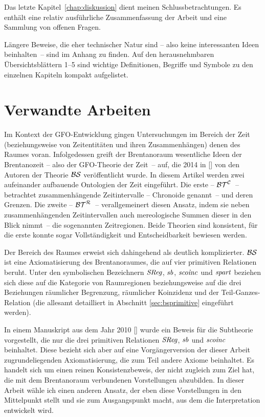 Das
letzte Kapitel~\ref{chap:diskussion} dient meinen Schlussbetrachtungen.
Es enthält eine relativ ausführliche Zusammenfassung der Arbeit und eine Sammlung von offenen Fragen.

Längere
Beweise, die eher technischer Natur sind -- also keine interessanten Ideen beinhalten~-- sind im Anhang zu finden.
Auf den herausnehmbaren Übersichtsblättern 1--5 sind wichtige Definitionen, Begriffe und Symbole zu den einzelnen Kapiteln kompakt aufgelistet.


\section{Verwandte Arbeiten}
Im Kontext der GFO-Entwicklung gingen Untersuchungen im Bereich der Zeit (beziehungsweise
von Zeitentitäten und ihren Zusammenhängen) denen des Raumes voran.
    Infolgedessen greift der Brentanoraum
    wesentliche Ideen der Brentanozeit -- also der GFO-Theorie der Zeit~-- auf, die 2014 in [\cite{baumann-r-2014-171-a}] von den Autoren der Theorie $\mathcal{BS}$ veröffentlicht wurde.
    In diesem Artikel werden zwei aufeinander aufbauende Ontologien der Zeit eingeführt.
    Die erste -- $\mathcal{BT}^{\mathcal{C}}$~-- betrachtet zusammenhängende Zeitintervalle -- Chronoide genannt~-- und deren Grenzen. 
    Die zweite -- $\mathcal{BT}^{\mathcal{R}}$~-- verallgemeinert diesen Ansatz, indem sie neben zusammenhängenden Zeitintervallen auch mereologische Summen dieser in den Blick nimmt~-- die sogenannten Zeitregionen.
    Beide Theorien sind konsistent, für die erste konnte sogar Vollständigkeit und Entscheidbarkeit bewiesen werden.
    
Der Bereich des Raumes erweist sich dahingehend als deutlich komplizierter.
$\mathcal{BS}$ ist eine Axiomatisierung des Brentanoraumes, die auf vier primitiven Relationen beruht. 
Unter den symbolischen Bezeichnern $\mathit{S\hspace*{-0.25ex}Reg}$, $\mathit{sb}$, $\mathit{scoinc}$ und $\mathit{spart}$ beziehen sich diese auf die Kategorie von Raumregionen beziehungsweise auf die drei Beziehungen räumlicher Begrenzung, räumlicher Koinzidenz und der Teil-Ganzes-Relation (die allesamt
detailliert in Abschnitt \ref{sec:bsprimitive} eingeführt werden).

In einem Manuskript
aus dem Jahr 2010 [\cite{baumann-r-2010-07-12-a}] wurde ein Beweis für die Subtheorie vorgestellt, die nur die drei primitiven Relationen $\mathit{S\hspace*{-0.25ex}Reg}$, $\mathit{sb}$ und $\mathit{scoinc}$ beinhaltet.
Diese bezieht sich aber auf eine Vorgängerversion der dieser Arbeit zugrundeliegenden Axiomatisierung, die zum Teil andere Axiome beinhaltet.
Es handelt sich um einen reinen Konsistenzbeweis, der nicht zugleich zum Ziel hat, die mit dem Brentanoraum verbundenen Vorstellungen abzubilden.
In dieser Arbeit wähle ich einen anderen Ansatz, der eben diese Vorstellungen in den Mittelpunkt stellt und sie zum Ausgangspunkt macht, aus dem die Interpretation entwickelt wird.

